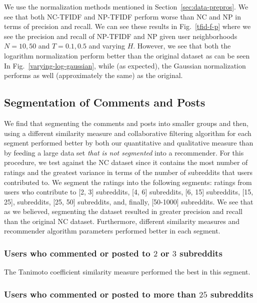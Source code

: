\documentclass{article}
\begin{document}
We use the normalization methods mentioned in Section~\ref{sec:data-prepros}. We see that both NC-TFIDF and NP-TFIDF perform worse than NC and NP in terms of precision and recall. We can see these 
results in Fig.~\ref{tfid-f-p} where we see the precision and recall of NP-TFIDF and NP given user neighborhoods
$N =10, 50$ and $T = 0.1, 0.5$ and varying $H$. However, we see that both the logarithm normalization 
perform better than the original dataset as can be seen In Fig.~\ref{varying-log-gaussian}, while (as expected), 
the Gaussian normalization performs as well (approximately the same) as the original. 
 
\subsection{Segmentation of Comments and Posts}\label{sec:set-com-posts}

We find that segmenting the comments and posts into smaller groups and then, using a different similarity measure
and collaborative filtering algorithm for each segment performed better by both our quantitative and qualitative
measure than by feeding a large data set \emph{that is not segmented} into a recommender. For this procedure, 
we test against the NC dataset since it contains the most number of ratings and the greatest variance
in terms of the number of subreddits that users contributed to. We segment the ratings into the following segments: 
ratings from users who contribute to [2, 3] subreddits, [4, 6] subreddits, [6, 15] subreddits, [15, 25], subreddits, [25, 50] 
subreddits, and, finally, [50-1000] subreddits. We see that as we believed, segmenting the dataset
resulted in greater precision and recall than the original NC dataset. Furthermore, different similarity 
measures and recommender algorithm parameters performed better in each segment. 

\subsubsection{Users who commented or posted to $2$ or $3$ subreddits}\label{2-3-users}

The Tanimoto coefficient similarity measure performed the best in this segment. 

\subsubsection{Users who commented or posted to more than $25$ subreddits}\label{more-than-25}
\end{document}
